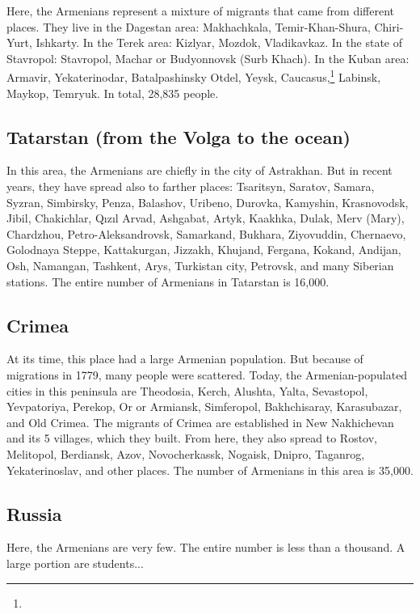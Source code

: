 Here, the Armenians represent a mixture of migrants that came from different places. They live in the Dagestan area: Makhachkala, Temir-Khan-Shura, Chiri-Yurt, Ishkarty. In the Terek area: Kizlyar, Mozdok, Vladikavkaz. In the state of Stavropol: Stavropol, Machar or   Budyonnovsk (Surb Khach). In the Kuban area: Armavir, Yekaterinodar, Batalpashinsky Otdel, Yeysk, Caucasus,\footnote{} Labinsk, Maykop, Temryuk. In total, 28,835 people. 

\subsection{Tatarstan (from the Volga to the ocean)}

In this area, the Armenians are chiefly in the city of Astrakhan. But in recent years, they have spread also to farther places: Tsaritsyn, Saratov, Samara, Syzran, Simbirsky, Penza, Balashov, Uribeno, Durovka, Kamyshin, Krasnovodsk, Jibil, Chakichlar, Qızıl Arvad, Ashgabat, Artyk, Kaakhka, Dulak, Merv (Mary), Chardzhou, Petro-Aleksandrovsk, Samarkand, Bukhara, Ziyovuddin, Chernaevo, Golodnaya Steppe, Kattakurgan, Jizzakh, Khujand, Fergana, Kokand, Andijan, Osh, Namangan, Tashkent, Arys, Turkistan city, Petrovsk, and many Siberian stations. The entire number of Armenians in Tatarstan is 16,000.

\subsection{Crimea}

At its time, this place had a large Armenian population. But because of migrations in 1779, many people were scattered. Today, the Armenian-populated cities in this peninsula are Theodosia, Kerch, Alushta, Yalta, Sevastopol, Yevpatoriya, Perekop, Or or Armiansk, Simferopol, Bakhchisaray, Karasubazar, and Old Crimea. The migrants of Crimea are established in New Nakhichevan and its 5 villages, which they built. From here, they also spread to Rostov, Melitopol, Berdiansk, Azov, Novocherkassk, Nogaisk, Dnipro, Taganrog, Yekaterinoslav, and other places. The number of Armenians in this area is 35,000. 

\subsection{Russia}

Here, the Armenians are very few. The entire number is less than a thousand. A large portion are students... 
\begin{adjarianpage}\label{page:27}\end{adjarianpage}%

